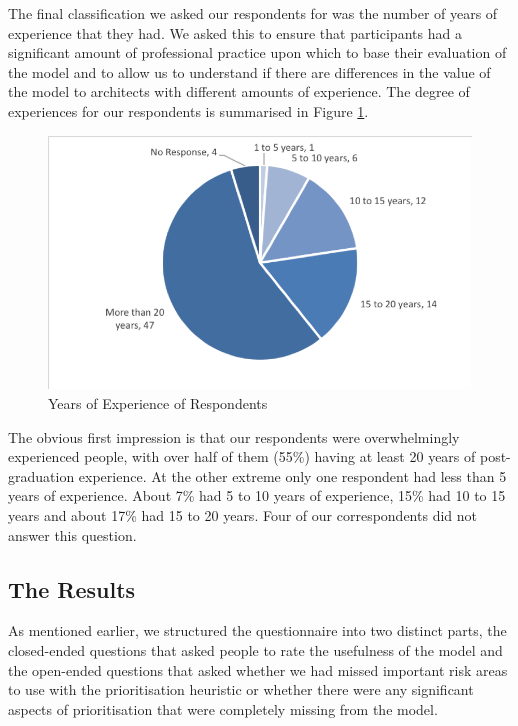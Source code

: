 The final classification we asked our respondents for was the number of years of experience that they had.  We asked this to ensure that participants had a significant amount of professional practice upon which to base their evaluation of the model and to allow us to understand if there are differences in the value of the model to architects with different amounts of experience.  The degree of experiences for our respondents is summarised in Figure \ref{figure:yearsexp}.
 
\begin{figure}
\centering
\includegraphics[width=12cm,trim={2 2 2 2},clip]{Figures/prioritisation-yearsexp-detailed}
\caption{Years of Experience of Respondents}
\label{figure:yearsexp}
\end{figure}

The obvious first impression is that our respondents were overwhelmingly experienced people, with over half of them (55\%) having at least 20 years of post-graduation experience.  At the other extreme only one respondent had less than 5 years of experience.  About 7\% had 5 to 10 years of experience, 15\% had 10 to 15 years and about 17\% had 15 to 20 years.  Four of our correspondents did not answer this question.

\subsection{The Results}

As mentioned earlier, we structured the questionnaire into two distinct parts, the closed-ended questions that asked people to rate the usefulness of the model and the open-ended questions that asked whether we had missed important risk areas to use with the prioritisation heuristic or whether there were any significant aspects of prioritisation that were completely missing from the model.


